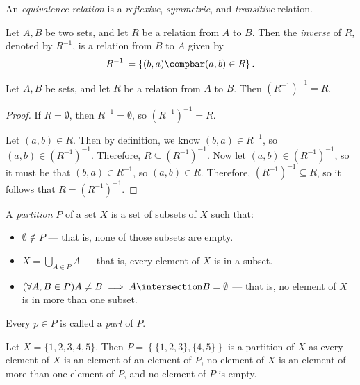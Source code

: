 \documentclass[12pt]{article}
\begin{document}
\begin{defn}\label{equivalence-relation}
    An \emph{equivalence relation} is a \emph{reflexive}, \emph{symmetric}, and \emph{transitive} relation.
\end{defn}

\begin{defn}
    Let $A, B$ be two sets, and let $R$ be a relation from $A$ to $B$. Then the \emph{inverse} of $R$, denoted by $R^{-1}$, is a relation from $B$ to $A$ given by \[R^{-1} \,= \left\{(b, a) \compbar (a, b) \in R \right\}.\]
\end{defn}

\begin{prop}
    Let $A, B$ be sets, and let $R$ be a relation from $A$ to $B$. Then $\left(R^{-1}\right)^{-1} = R$.
\end{prop}

\begin{proof}
    If $R = \emptyset$, then $R^{-1} = \emptyset$, so $\left(R^{-1}\right)^{-1} = R$.

    Let $(a, b) \in R$. Then by definition, we know $(b, a) \in R^{-1}$, so $(a, b) \in \left(R^{-1}\right)^{-1}$. Therefore, $R \subseteq \left(R^{-1}\right)^{-1}$. Now let $(a, b) \in \left(R^{-1}\right)^{-1}$, so it must be that $(b, a) \in R^{-1}$, so $(a, b) \in R$. Therefore, $\left(R^{-1}\right)^{-1} \subseteq R$, so it follows that $R = \left(R^{-1}\right)^{-1}$.
\end{proof}

\begin{defn}\label{partition}
    A \emph{partition} $P$ of a set $X$ is a set of subsets of $X$ such that:
    \begin{itemize}
        \item $\emptyset \notin P$ --- that is, none of those subsets are empty.
        \item $X = \bigcup_{A\in P}A$ --- that is, every element of $X$ is in a subset.
        \item $(\forall A, B \in P) A \neq B \implies A \intersection B = \emptyset$ --- that is, no element of $X$ is in more than one subset.
    \end{itemize}
    Every $p \in P$ is called a \emph{part} of $P$.
\end{defn}

\begin{exmp}
    Let $X = \{1, 2, 3, 4, 5\}$. Then $P = \left\{\{1, 2, 3\}, \{4, 5\}\right\}$ is a partition of $X$ as every element of $X$ is an element of an element of $P$, no element of $X$ is an element of more than one element of $P$, and no element of $P$ is empty.
\end{exmp}
\end{document}
